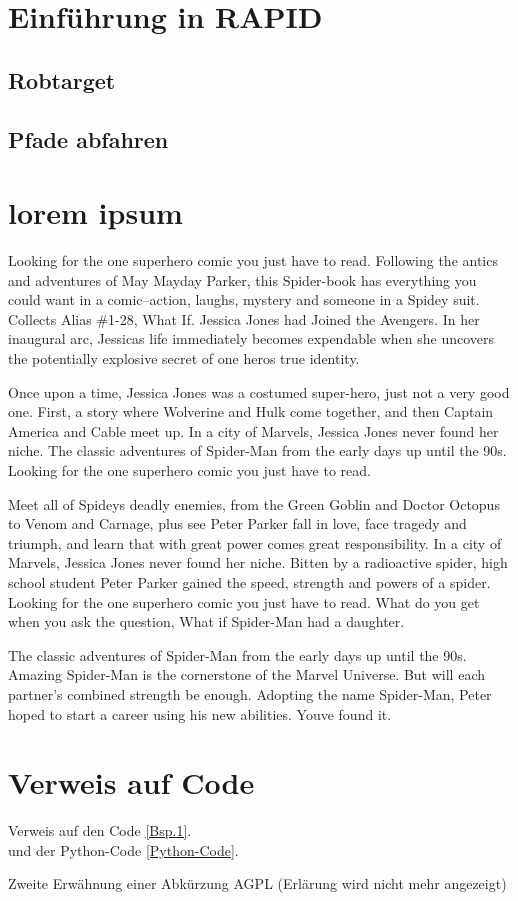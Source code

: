 \section{Einführung in RAPID}

\subsection{Robtarget}
\subsection{Pfade abfahren}


\section{lorem ipsum}
Looking for the one superhero comic you just have to read. Following the antics and adventures of May Mayday Parker, this Spider-book has everything you could want in a comic--action, laughs, mystery and someone in a Spidey suit. Collects Alias \#1-28, What If. Jessica Jones had Joined the Avengers. In her inaugural arc, Jessicas life immediately becomes expendable when she uncovers the potentially explosive secret of one heros true identity. 

Once upon a time, Jessica Jones was a costumed super-hero, just not a very good one. First, a story where Wolverine and Hulk come together, and then Captain America and Cable meet up. In a city of Marvels, Jessica Jones never found her niche. The classic adventures of Spider-Man from the early days up until the 90s. Looking for the one superhero comic you just have to read.

Meet all of Spideys deadly enemies, from the Green Goblin and Doctor Octopus to Venom and Carnage, plus see Peter Parker fall in love, face tragedy and triumph, and learn that with great power comes great responsibility. In a city of Marvels, Jessica Jones never found her niche. Bitten by a radioactive spider, high school student Peter Parker gained the speed, strength and powers of a spider. Looking for the one superhero comic you just have to read. What do you get when you ask the question, What if Spider-Man had a daughter.

The classic adventures of Spider-Man from the early days up until the 90s. Amazing Spider-Man is the cornerstone of the Marvel Universe. But will each partner’s combined strength be enough. Adopting the name Spider-Man, Peter hoped to start a career using his new abilities. Youve found it.

\section{Verweis auf Code}
Verweis auf den Code \autoref{Bsp.1}.\\
und der Python-Code \autoref{Python-Code}.

Zweite Erwähnung einer Abkürzung \ac{AGPL} (Erlärung wird nicht mehr angezeigt)